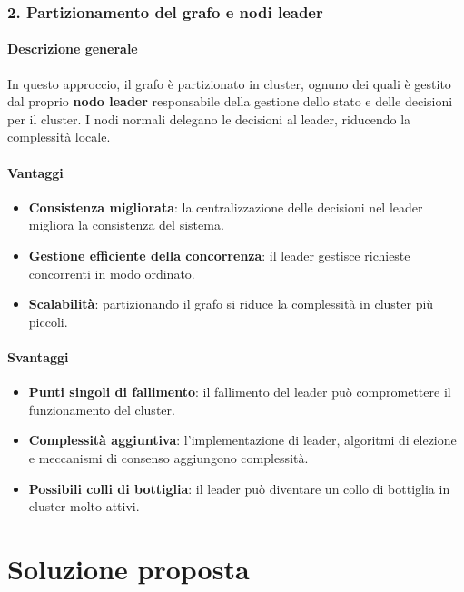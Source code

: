\documentclass[12pt, a4paper]{report}
\begin{document}
\subsubsection{2. Partizionamento del grafo e nodi leader}

\paragraph{Descrizione generale}
\begin{flushleft}
In questo approccio, il grafo \`e partizionato in cluster, ognuno dei quali \`e gestito dal proprio \textbf{nodo leader} responsabile della gestione dello stato e delle decisioni per il cluster. I nodi normali delegano le decisioni al leader, riducendo la complessit\`a locale.
\end{flushleft}
\paragraph{Vantaggi}

\begin{itemize}
    \item \textbf{Consistenza migliorata}: la centralizzazione delle decisioni nel leader migliora la consistenza del sistema.
    \item \textbf{Gestione efficiente della concorrenza}: il leader gestisce richieste concorrenti in modo ordinato.
    \item \textbf{Scalabilit\`a}: partizionando il grafo si riduce la complessit\`a in cluster pi\`u piccoli.
\end{itemize}

\paragraph{Svantaggi}

\begin{itemize}
    \item \textbf{Punti singoli di fallimento}: il fallimento del leader pu\`o compromettere il funzionamento del cluster.
    \item \textbf{Complessit\`a aggiuntiva}: l'implementazione di leader, algoritmi di elezione e meccanismi di consenso aggiungono complessit\`a.
    \item \textbf{Possibili colli di bottiglia}: il leader pu\`o diventare un collo di bottiglia in cluster molto attivi.
\end{itemize}

\section{Soluzione proposta}
\end{document}

